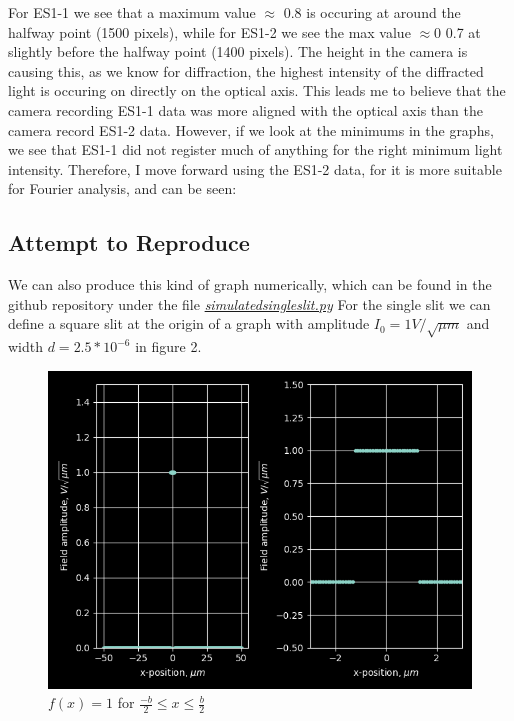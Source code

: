 \documentclass{article}
\begin{document}
For ES1-1 we see that a maximum value $\approx$ 0.8 is occuring at around the halfway point (1500 pixels), while for ES1-2 we see the max value $\approx0$ 0.7 at slightly before the halfway point (1400 pixels). The height in the camera is causing this, as we know for diffraction, the highest intensity of the diffracted light is occuring on directly on the optical axis. This leads me to believe that the camera recording ES1-1 data was more aligned with the optical axis than the camera record ES1-2 data. However, if we look at the minimums in the graphs, we see that ES1-1 did not register much of anything for the right minimum light intensity. Therefore, I move forward using the ES1-2 data, for it is more suitable for Fourier analysis, and can be seen:



\subsection{Attempt to Reproduce}
We can also produce this kind of graph numerically, which can be found in the github repository under the file \href{https://github.com/fusionby2030/Numerical_Methods/tree/master/Labs/017E/simulatedsingleslit.py}{\textit{simulatedsingleslit.py}}
For the single slit we can define a square slit at the origin of a graph with amplitude $ I_0 = 1 V/ \sqrt{\mu m} $ and width $d=2.5*10^{-6}$ in figure 2.

\begin{figure}[h]
  \caption{$f(x) = 1$ for $\frac{-b}{2} \le x \leq\frac{b}{2}$}
  \centering
  \includegraphics[scale=0.6]{slitrepro.png}
\end{figure}
\end{document}
